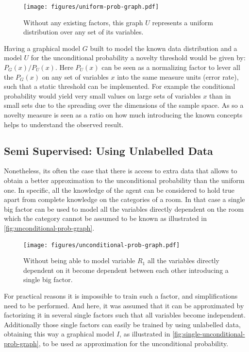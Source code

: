 \documentclass[runningheads,a4paper]{llncs}
\begin{document}
\begin{figure}[h]
\centering
\texttt{[image: figures/uniform-prob-graph.pdf]}
\caption{\label{fig:uniform-prob-graph}Without any existing factors, this graph $U$ represents a
         uniform distribution over any set of its variables.}
\end{figure}

Having a graphical model $G$ built to model the known data distribution and a model
$U$ for the unconditional probability a novelty threshold would be given by:
$P_G(x)/P_U(x)$.
Here $P_{U}(x)$ can be seen as a normalizing factor to lever all the $P_G(x)$ on any set of
variables $x$ into the same measure units (error rate), such that a static threshold can be implemented.
For example the conditional probability would yield very small values on large sets of variables
$x$ than in small sets due to the spreading over the dimensions of the sample space.
As so a novelty measure is seen as a ratio on how much introducing the known concepts helps to
understand the observed result.


\subsection{Semi Supervised: Using Unlabelled Data}
Nonetheless, its often the case that there is access to extra data that allows to
obtain a better approximation to the unconditional probability than the uniform one.
In specific, all the knowledge of the agent can be considered to hold true apart from
complete knowledge on the categories of a room.
In that case a single big factor can be used to model all the variables directly
dependent on the room which the category cannot be assumed to be known as illustrated in
\autoref{fig:unconditional-prob-graph}.

\begin{figure}
\centering
\texttt{[image: figures/unconditional-prob-graph.pdf]}
\caption{\label{fig:unconditional-prob-graph}Without being able to model variable $R_1$
all the variables directly dependent on it become dependent between each other introducing
a single big factor.}
\end{figure}

For practical reasons it is impossible to train such a factor, and simplifications need
to be performed. And here, it was assumed that it can be approximated by factorizing
it in several single factors such that all variables become independent.
Additionally those single factors can easily be trained by using unlabelled data,
obtaining this way a graphical model $I$,
as illustrated in \autoref{fig:single-unconditional-prob-graph},
to be used as approximation for the unconditional probability.
\end{document}
